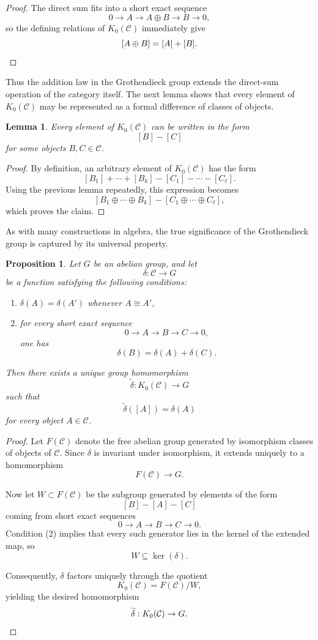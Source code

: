 \documentclass[12pt,reqno]{amsart}
\theoremstyle{plain}
\newtheorem{prop}[thm]{Proposition}
\numberwithin{equation}{section}
\newtheorem{lemma}{Lemma}
\begin{document}
\begin{proof}
The direct sum fits into a short exact sequence
\[
0\longrightarrow A\longrightarrow A\oplus B\longrightarrow B\longrightarrow 0,
\]
so the defining relations of $K_0(\mathcal C)$ immediately give
\[
[A\oplus B]=[A]+[B].
\qedhere
\]
\end{proof}

Thus the addition law in the Grothendieck group extends the direct-sum operation of the category itself.
The next lemma shows that every element of $K_0(\mathcal C)$ may be represented as a formal difference of classes of objects.

\begin{lemma}\label{lem: difference}
Every element of $K_0(\mathcal C)$ can be written in the form
\[
[B]-[C]
\]
for some objects $B,C\in\mathcal C$.
\end{lemma}

\begin{proof}
By definition, an arbitrary element of $K_0(\mathcal C)$ has the form
\[
[B_1]+\cdots+[B_k]-[C_1]-\cdots-[C_\ell].
\]
Using the previous lemma repeatedly, this expression becomes
\[
[B_1\oplus\cdots\oplus B_k]
-
[C_1\oplus\cdots\oplus C_\ell],
\]
which proves the claim.
\end{proof}

As with many constructions in algebra, the true significance of the Grothendieck group is captured by its universal property.

\begin{prop}\label{prop: uprop of K0}
Let $G$ be an abelian group, and let
\[
\delta:\mathcal C\to G
\]
be a function satisfying the following conditions:
\begin{enumerate}[label=$(\arabic*)$]
    \item $\delta(A)=\delta(A')$ whenever $A\cong A'$,
    \item for every short exact sequence
    \[
    0\longrightarrow A\longrightarrow B\longrightarrow C\longrightarrow 0,
    \]
    one has
    \[
    \delta(B)=\delta(A)+\delta(C).
    \]
\end{enumerate}
Then there exists a unique group homomorphism
\[
\widetilde{\delta}:K_0(\mathcal C)\to G
\]
such that
\[
\widetilde{\delta}([A])=\delta(A)
\]
for every object $A\in\mathcal C$.
\end{prop}

\begin{proof}
Let $F(\mathcal C)$ denote the free abelian group generated by isomorphism classes of objects of $\mathcal C$. Since $\delta$ is invariant under isomorphism, it extends uniquely to a homomorphism
\[
F(\mathcal C)\to G.
\]

Now let $W\subset F(\mathcal C)$ be the subgroup generated by elements of the form
\[
[B]-[A]-[C]
\]
coming from short exact sequences
\[
0\to A\to B\to C\to 0.
\]
Condition (2) implies that every such generator lies in the kernel of the extended map, so
\[
W\subseteq \ker(\delta).
\]

Consequently, $\delta$ factors uniquely through the quotient
\[
K_0(\mathcal C)=F(\mathcal C)/W,
\]
yielding the desired homomorphism
\[
\widetilde{\delta}:K_0(\mathcal C)\to G.
\qedhere
\]
\end{proof}
\end{document}

